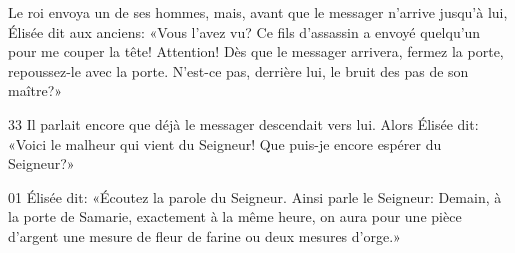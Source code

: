 Le roi envoya un de ses hommes, mais, avant que le messager n’arrive jusqu’à lui, Élisée dit aux anciens: «Vous l’avez vu? Ce fils d’assassin a envoyé quelqu’un pour me couper la tête! Attention! Dès que le messager arrivera, fermez la porte, repoussez-le avec la porte. N’est-ce pas, derrière lui, le bruit des pas de son maître?»

33 Il parlait encore que déjà le messager descendait vers lui. Alors Élisée dit: «Voici le malheur qui vient du Seigneur! Que puis-je encore espérer du Seigneur?»

01 Élisée dit: «Écoutez la parole du Seigneur. Ainsi parle le Seigneur: Demain, à la porte de Samarie, exactement à la même heure, on aura pour une pièce d’argent une mesure de fleur de farine ou deux mesures d’orge.»

